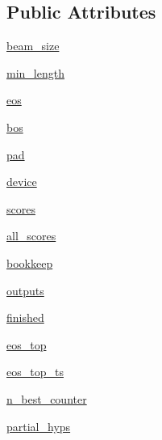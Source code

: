 \subsection*{Public Attributes}
\begin{DoxyCompactItemize}
\item 
\hyperlink{classparlai_1_1core_1_1torch__generator__agent_1_1TreeSearch_a2381c33e5233a5f5c1e50c65ab0ee572}{beam\+\_\+size}
\item 
\hyperlink{classparlai_1_1core_1_1torch__generator__agent_1_1TreeSearch_a71d6802f40cf025cd5c0242070d78b62}{min\+\_\+length}
\item 
\hyperlink{classparlai_1_1core_1_1torch__generator__agent_1_1TreeSearch_a51a1164086e9033c942b3c7ab3d6a194}{eos}
\item 
\hyperlink{classparlai_1_1core_1_1torch__generator__agent_1_1TreeSearch_aaef8214c017d387336317a37f395df3c}{bos}
\item 
\hyperlink{classparlai_1_1core_1_1torch__generator__agent_1_1TreeSearch_aa00f03954e2bf737b13d1b43a609fb00}{pad}
\item 
\hyperlink{classparlai_1_1core_1_1torch__generator__agent_1_1TreeSearch_a37b3f7f827909e3aa2d8e35c32c41e81}{device}
\item 
\hyperlink{classparlai_1_1core_1_1torch__generator__agent_1_1TreeSearch_a07cf31c1808301e5b4d1d0ef128c5948}{scores}
\item 
\hyperlink{classparlai_1_1core_1_1torch__generator__agent_1_1TreeSearch_ac9e79a3effa48d2e35ac879620cd639e}{all\+\_\+scores}
\item 
\hyperlink{classparlai_1_1core_1_1torch__generator__agent_1_1TreeSearch_a1f1f3da5f6079f5043d28e72b2a6fdfa}{bookkeep}
\item 
\hyperlink{classparlai_1_1core_1_1torch__generator__agent_1_1TreeSearch_aae65afe3c0c8855e9a54ba44bf7209ce}{outputs}
\item 
\hyperlink{classparlai_1_1core_1_1torch__generator__agent_1_1TreeSearch_ab2d79d6023881123b8960356243692d9}{finished}
\item 
\hyperlink{classparlai_1_1core_1_1torch__generator__agent_1_1TreeSearch_a5b7078c44965d7a9d54250149d164c8f}{eos\+\_\+top}
\item 
\hyperlink{classparlai_1_1core_1_1torch__generator__agent_1_1TreeSearch_a0a1eb3fae74a9b2edbb54cc4162878af}{eos\+\_\+top\+\_\+ts}
\item 
\hyperlink{classparlai_1_1core_1_1torch__generator__agent_1_1TreeSearch_a2b64a54420c470d50e389cdaacde4933}{n\+\_\+best\+\_\+counter}
\item 
\hyperlink{classparlai_1_1core_1_1torch__generator__agent_1_1TreeSearch_a159f5589fdfea9a040c4c1ca5c14ea2c}{partial\+\_\+hyps}
\end{DoxyCompactItemize}


